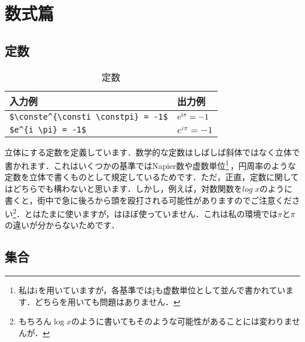 \documentclass[uplatex]{jsreport}
\begin{document}
\chapter{数式篇}
\section{定数}
\begin{table}[htbp]
  \centering
  \caption{定数}
  \label{table:2.const}
  \begin{tabular}{ll}\hline
    入力例 & 出力例 \\ \hline
    \verb|$\conste^{\consti \constpi} = -1$| & $\mathrm{e}^{\mathrm{i} \mathrm{\pi}} = -1$\\
    \verb|$e^{i \pi} = -1$| & $e^{i \pi} = -1$ \\\hline
  \end{tabular}
\end{table}\par
立体にする定数を定義しています．数学的な定数はしばしば斜体ではなく立体で書かれます．これはいくつかの基準ではNapier数や虚数単位\footnote{私は$\mathrm{i}$を用いていますが，各基準では$\mathrm{j}$も虚数単位として並んで書かれています．どちらを用いても問題はありません．}\,，円周率のような定数を立体で書くものとして規定しているためです\cite{ISO80000-2,JISZ8201,nihonbutsuri}．ただ，正直，定数に関してはどちらでも構わないと思います．しかし，例えば，対数関数を$log\;x$のように書くと，街中で急に後ろから頭を殴打される可能性がありますのでご注意ください\footnote{もちろん$\log x$のように書いてもそのような可能性があることには変わりませんが．}．とはたまに使いますが，はほぼ使っていません．これは私の環境では$\pi$と$\mathrm{\pi}$の違いが分からないためです．
\par
\section{集合}
\end{document}
